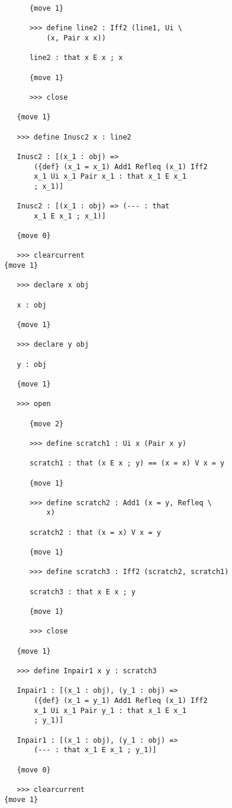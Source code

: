 \documentclass[12pt]{article}
\begin{document}
\begin{verbatim}
      {move 1}

      >>> define line2 : Iff2 (line1, Ui \
          (x, Pair x x))

      line2 : that x E x ; x

      {move 1}

      >>> close

   {move 1}

   >>> define Inusc2 x : line2

   Inusc2 : [(x_1 : obj) => 
       ({def} (x_1 = x_1) Add1 Refleq (x_1) Iff2 
       x_1 Ui x_1 Pair x_1 : that x_1 E x_1 
       ; x_1)]

   Inusc2 : [(x_1 : obj) => (--- : that 
       x_1 E x_1 ; x_1)]

   {move 0}

   >>> clearcurrent
{move 1}

   >>> declare x obj

   x : obj

   {move 1}

   >>> declare y obj

   y : obj

   {move 1}

   >>> open

      {move 2}

      >>> define scratch1 : Ui x (Pair x y)

      scratch1 : that (x E x ; y) == (x = x) V x = y

      {move 1}

      >>> define scratch2 : Add1 (x = y, Refleq \
          x)

      scratch2 : that (x = x) V x = y

      {move 1}

      >>> define scratch3 : Iff2 (scratch2, scratch1)

      scratch3 : that x E x ; y

      {move 1}

      >>> close

   {move 1}

   >>> define Inpair1 x y : scratch3

   Inpair1 : [(x_1 : obj), (y_1 : obj) => 
       ({def} (x_1 = y_1) Add1 Refleq (x_1) Iff2 
       x_1 Ui x_1 Pair y_1 : that x_1 E x_1 
       ; y_1)]

   Inpair1 : [(x_1 : obj), (y_1 : obj) => 
       (--- : that x_1 E x_1 ; y_1)]

   {move 0}

   >>> clearcurrent
{move 1}


\end{verbatim}
\end{document}

